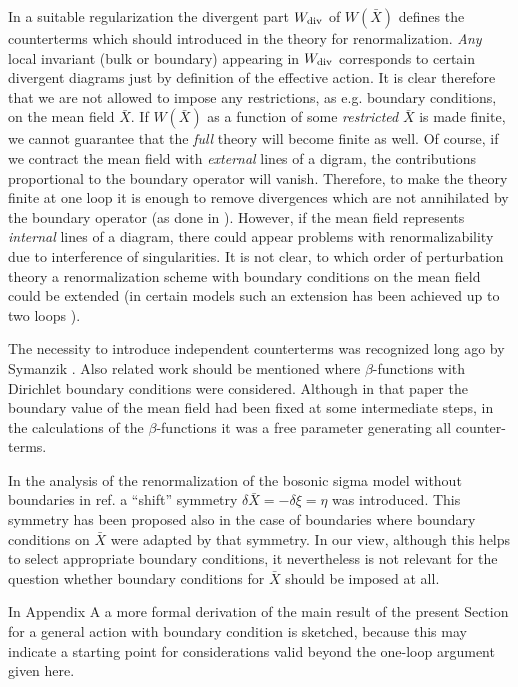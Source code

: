 \documentclass[a4paper,12pt]{article}
\begin{document}
In a suitable regularization the divergent part 
$W_{{\mbox {\scriptsize {div}}}}$ of $W(\bar X)$
defines the counterterms which should introduced in the
theory for renormalization. {\it Any} local invariant
(bulk or boundary) appearing in $W_{{\mbox {\scriptsize {div}}}}$
corresponds to certain divergent diagrams just by definition
of the effective action. It is clear therefore that we
are not allowed to impose any restrictions, as e.g.
boundary conditions, on the mean field $\bar X$. 
If  $W(\bar X)$ as a function
of some {\it restricted} $\bar X$ is made finite, 
we cannot guarantee that
the {\it full} theory will become finite as well.
Of course, if we contract the mean field with {\it
external} lines of a digram, the contributions proportional
to the boundary operator will vanish. Therefore, to make the
theory finite at one loop it is enough to remove divergences
which are not annihilated by the boundary operator (as done
in \cite{Callan88}). However, if the mean field represents
{\it internal} lines of a diagram, there could appear problems
with renormalizability due to interference of singularities.
It is not clear, to which order of perturbation theory
a renormalization scheme with boundary conditions on the
mean field could be extended (in certain models such an extension 
has been achieved up to two loops \cite{McO2}). 

The necessity to introduce independent counterterms was recognized
long ago by Symanzik \cite{Symanzik}. Also  related 
work \cite{Wipf94} should be mentioned where $\beta$-functions with
Dirichlet boundary conditions were considered. Although in that
paper the boundary value of the mean field had been fixed at
some intermediate steps, in the calculations of the $\beta$-functions
it was a free parameter generating all counter-terms.


In the analysis 
of the renormalization
of the bosonic sigma model without boundaries 
in ref. \cite{Howe88} 
a ``shift'' symmetry $\delta \bar X=-\delta\xi=\eta$
was introduced. This symmetry has been proposed also
in the case of boundaries \cite{Osborn91} where
boundary conditions on $\bar X$ were adapted by that
symmetry. In our
view, although this helps to select appropriate
boundary conditions, it nevertheless is not
relevant for the question 
whether boundary conditions for $\bar X$ should be imposed at all.

In Appendix A a more formal derivation of the main result of the
present Section
for a general action with boundary condition is sketched, 
because this may indicate a starting point for 
considerations valid beyond the one-loop argument given 
here. 
\end{document}
